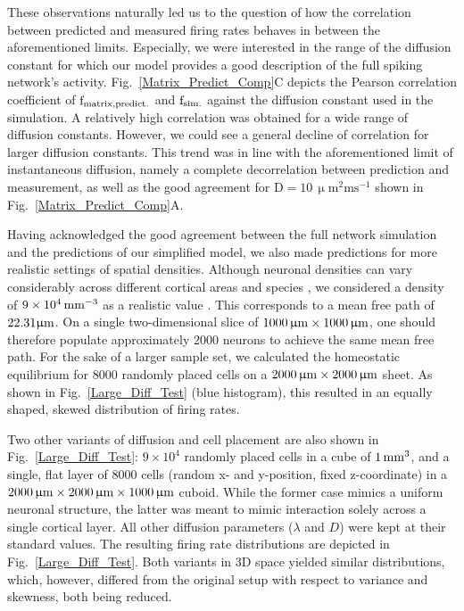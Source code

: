 \documentclass[10pt,letterpaper]{article}
\begin{document}
These observations naturally led us to the question of how the correlation between predicted and measured firing rates behaves in between the aforementioned limits. Especially, we were interested in the range of the diffusion constant for which our model provides a good description of the full spiking network's activity. Fig.~\ref{Matrix_Predict_Comp}C depicts the Pearson correlation coefficient of $\mathrm{f_{\rm matrix, predict.}}$ and $\mathrm{f_{\rm sim.}}$ against the diffusion constant used in the simulation. A relatively high correlation was obtained for a wide range of diffusion constants. However, we could see a general decline of correlation for larger diffusion constants. This trend was in line with the aforementioned limit of instantaneous diffusion, namely a complete decorrelation between prediction and measurement, as well as the good agreement for $\mathrm{D= 10\, \upmu m^2 ms^{-1}}$ shown in Fig.~\ref{Matrix_Predict_Comp}A.

Having acknowledged the good agreement between the full network simulation and the predictions of our simplified model, we also made predictions for more realistic settings of spatial densities. Although neuronal densities can vary considerably across different cortical areas and species \cite{Collins_2010}, we considered a density of $\rm 9\times 10^4\, mm^{-3}$ as a realistic value \cite{Schuez_1989}. This corresponds to a mean free path of $\rm 22.31 \upmu m$. On a single two-dimensional slice of $\rm 1000\, \upmu m \times 1000\, \upmu m$, one should therefore populate approximately $2000$ neurons to achieve the same mean free path. For the sake of a larger sample set, we calculated the homeostatic equilibrium for $8000$ randomly placed cells on a $\rm 2000\, \upmu m \times 2000\, \upmu m$ sheet. As shown in Fig.~\ref{Large_Diff_Test} (blue histogram), this resulted in an equally shaped, skewed distribution of firing rates.  

Two other variants of diffusion and cell placement are also shown in Fig.~\ref{Large_Diff_Test}: $9\times 10^4$ randomly placed cells in a cube of $\rm 1\, mm^3$, and a single, flat layer of $8000$ cells (random x- and y-position, fixed z-coordinate) in a $\rm 2000 \, \upmu m \times 2000 \, \upmu m \times 1000 \, \upmu m$ cuboid. While the former case mimics a uniform neuronal structure, the latter was meant to mimic interaction solely across a single cortical layer. All other diffusion parameters ($\lambda$ and $D$) were kept at their standard values. The resulting firing rate distributions are depicted in Fig.~\ref{Large_Diff_Test}. Both variants in 3D space yielded similar distributions, which, however, differed from the original setup with respect to variance and skewness, both being reduced.
\end{document}
